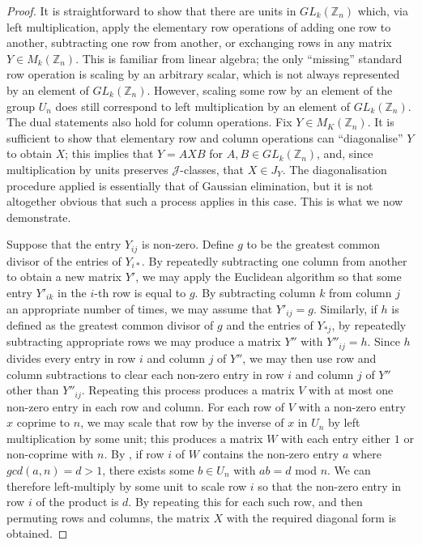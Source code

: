 \documentclass[11pt]{article}
\numberwithin{equation}{section}
\newcommand{\J}{\mathscr{J}}
\newcommand{\Z}{\mathbb{Z}}
\begin{document}
\begin{proof}
  It is straightforward to show that there are units in $GL_k(\Z_n)$ which, via
  left multiplication, apply the elementary row operations of adding one row to
  another, subtracting one row from another, or exchanging rows in any matrix $Y
  \in M_k(\Z_n)$. This is familiar from linear algebra; the only ``missing''
  standard row operation is scaling by an arbitrary scalar, which is not
  always represented by an element of $GL_k(\Z_n)$. However, scaling some row by
  an element of the group $U_n$ does still correspond to left multiplication by
  an element of $GL_k(\Z_n)$. The dual statements also hold for column operations.
  Fix $Y \in M_K(\Z_n)$. It is sufficient to show that elementary row and column operations
  can ``diagonalise'' $Y$ to obtain $X$; this implies that $Y = AXB$ for $A,
  B \in GL_k(\Z_n)$, and, since multiplication by units preserves $\J$-classes,
  that $X \in J_Y$.
  The diagonalisation procedure applied is essentially that of Gaussian
  elimination, but it is not altogether obvious that such a process applies in
  this case. This is what we now demonstrate.

  Suppose that the entry $Y_{ij}$ is non-zero. Define $g$ to be the greatest
  common divisor of the entries of $Y_{i*}$. By repeatedly subtracting one
  column from another to obtain a new matrix $Y'$, we may apply the Euclidean
  algorithm so that some entry $Y'_{ik}$ in the $i$-th row is equal to $g$. By
  subtracting column $k$ from column $j$ an appropriate number of times, we may
  assume that $Y'_{ij} = g$. Similarly, if $h$ is defined as the greatest common
  divisor of $g$ and the entries of $Y_{*j}$, by repeatedly subtracting
  appropriate rows we may produce a matrix $Y''$ with $Y''_{ij} = h$. Since $h$
  divides every entry in row $i$ and column $j$ of $Y''$, we may then use row and
  column subtractions to clear each non-zero entry in row $i$ and column $j$ of
  $Y''$ other than $Y''_{ij}$. Repeating this process produces a matrix $V$ with
  at most one non-zero entry in each row and column. For each row of $V$ with a
  non-zero entry $x$ coprime to $n$, we may scale that row by the inverse of $x$
  in $U_n$ by left multiplication by some unit; this produces a matrix $W$ with
  each entry either $1$ or non-coprime with $n$. By ,
  if row $i$ of $W$ contains the non-zero entry $a$ where $gcd(a, n) = d > 1$,
  there exists some $b \in U_n$ with $ab = d$ mod $n$. We can therefore
  left-multiply by some unit to scale row $i$ so that the non-zero entry in row
  $i$ of the product is $d$. By repeating this for each such row, and then
  permuting rows and columns, the matrix $X$ with the required diagonal form is
  obtained.
\end{proof}
\end{document}
